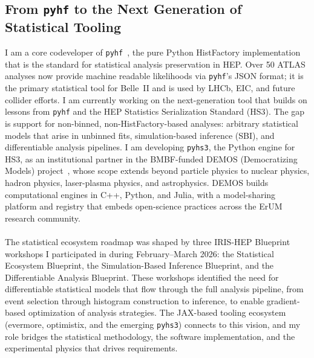\documentclass[10pt,a4paper,sans]{moderncv} %
\begin{document}
\subsection{From \texttt{pyhf} to the Next Generation of Statistical Tooling}
I am a core codeveloper of \texttt{pyhf}~\cite{Heinrich2021}, the pure Python HistFactory implementation that is the standard for statistical analysis preservation in HEP. Over 50 ATLAS analyses now provide machine readable likelihoods via \texttt{pyhf}'s JSON format; it is the primary statistical tool for Belle~II and is used by LHCb, EIC, and future collider efforts. I am currently working on the next-generation tool that builds on lessons from \texttt{pyhf} and the HEP Statistics Serialization Standard (HS3). The gap is support for non-binned, non-HistFactory-based analyses: arbitrary statistical models that arise in unbinned fits, simulation-based inference (SBI), and differentiable analysis pipelines. I am developing \texttt{pyhs3}, the Python engine for HS3, as an institutional partner in the BMBF-funded DEMOS (Democratizing Models) project~\cite{DEMOS2025}, whose scope extends beyond particle physics to nuclear physics, hadron physics, laser-plasma physics, and astrophysics. DEMOS builds computational engines in C++, Python, and Julia, with a model-sharing platform and registry that embeds open-science practices across the ErUM research community.
\\
\\
The statistical ecosystem roadmap was shaped by three IRIS-HEP Blueprint workshops I participated in during February--March 2026: the Statistical Ecosystem Blueprint, the Simulation-Based Inference Blueprint, and the Differentiable Analysis Blueprint. These workshops identified the need for differentiable statistical models that flow through the full analysis pipeline, from event selection through histogram construction to inference, to enable gradient-based optimization of analysis strategies. The JAX-based tooling ecosystem (evermore, optimistix, and the emerging \texttt{pyhs3}) connects to this vision, and my role bridges the statistical methodology, the software implementation, and the experimental physics that drives requirements.
\end{document}
